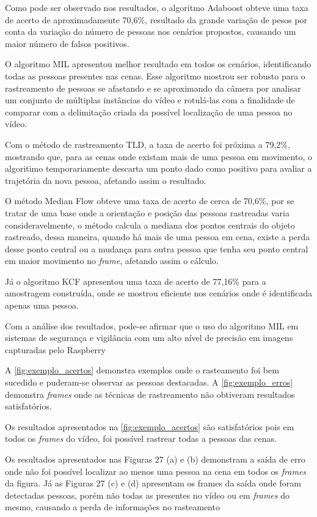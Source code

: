 \documentclass[12pt,oneside,a4paper,chapter=TITLE,section=TITLE,sumario=tradicional]{abntex2}
\begin{document}
Como pode ser observado nos resultados, o algoritmo Adaboost obteve uma taxa de acerto de aproximadamente 70,6\%, resultado da grande variação de pesos por conta da variação do número de pessoas nos cenários propostos, causando um maior número de falsos positivos.

O algoritmo MIL apresentou melhor resultado em todos os cenários, identificando todas as pessoas presentes nas cenas. Esse algoritmo mostrou ser robusto para o rastreamento de pessoas se afastando e se aproximando da câmera por analisar um conjunto de múltiplas instâncias do vídeo e rotulá-las com a finalidade de comparar com a delimitação criada da possível localização de uma pessoa no vídeo.

Com o método de rastreamento TLD, a taxa de acerto foi próxima a 79,2\%, mostrando que, para as cenas onde existam mais de uma pessoa em movimento, o algoritimo temporariamente descarta um ponto dado como positivo para avaliar a trajetória da nova pessoa, afetando assim o resultado.

O método Median Flow obteve uma taxa de acerto de cerca de 70,6\%, por se tratar de uma base onde a orientação e posição das pessoas rastreadas varia consideravelmente, o método calcula a mediana dos pontos centrais do objeto rastreado, dessa maneira, quando há mais de uma pessoa em cena, existe a perda desse ponto central ou a mudança para outra pessoa que tenha seu ponto central em maior movimento no \textit{frame}, afetando assim o cálculo.

Já o algoritmo KCF apresentou uma taxa de acerto de 77,16\% para a amostragem construída, onde se mostrou eficiente nos cenários onde é identificada apenas uma pessoa. 

Com a análise dos resultados, pode-se afirmar que o uso do algoritmo MIL em sistemas de segurança e vigilância com um alto nível de precisão em imagens capturadas pelo Raspberry 

A \autoref{fig:exemplo_acertos} demonstra exemplos onde o rasteamento foi bem sucedido e puderam-se observar as pessoas destacadas.
A \autoref{fig:exemplo_erros} demonstra \textit{frames} onde as técnicas de rastreamento não obtiveram resultados satisfatórios.

Os resultados apresentados na \autoref{fig:exemplo_acertos} são satisfatórios pois em todos os \textit{frames} do vídeo, foi possível rastrear todas a pessoas das cenas.

Os resultados apresentados nas Figuras 27 (a) e (b) demonstram a saída de erro onde não foi possível localizar ao menos uma pessoa na cena em todos os \textit{frames} da figura.
Já as Figuras 27 (c) e (d) apresentam os frames da saída onde foram detectadas pessoas, porém não todas as presentes no vídeo ou em \textit{frames} do mesmo, causando a perda de informações no rasteamento 
\end{document}
